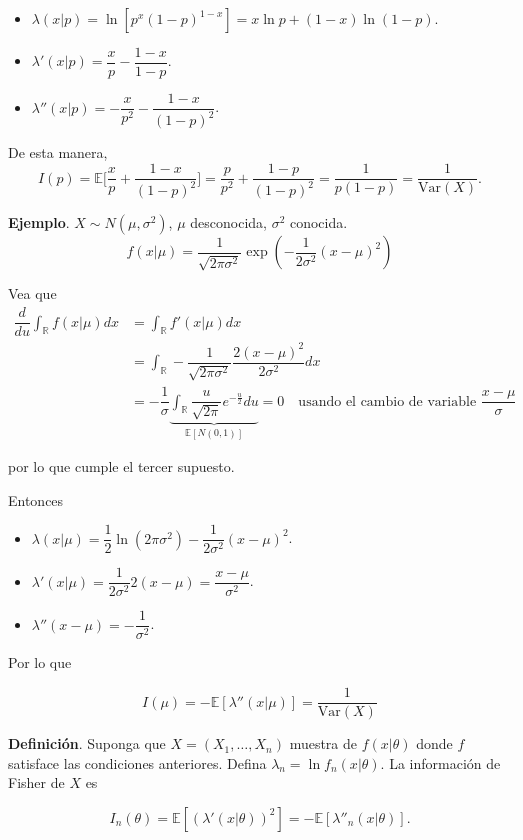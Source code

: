 \documentclass[
  12pt,
]{book}
\begin{document}
\begin{itemize}
\item
  \(\lambda(x|p) = \ln[p^x(1-p)^{1-x}] = x\ln p + (1-x)\ln(1-p)\).
\item
  \(\lambda'(x|p) = \dfrac xp-\dfrac{1-x}{1-p}\).
\item
  \(\lambda''(x|p) = -\dfrac x{p^2}-\dfrac{1-x}{(1-p)^2}\).
\end{itemize}

De esta manera,
\[I(p) = \mathbb E\bigg[\dfrac xp + \dfrac{1-x}{(1-p)^2}\bigg] = \dfrac p{p^2}+\dfrac{1-p}{(1-p)^2} = \dfrac 1{p(1-p)} = \dfrac 1{\text{Var}(X)}.\]

\textbf{Ejemplo}. \(X\sim N(\mu,\sigma^2)\), \(\mu\) desconocida, \(\sigma^2\) conocida.
\[f(x|\mu) = \dfrac{1}{\sqrt{2\pi\sigma^2}}\exp\left(-\dfrac 1{2\sigma^2}(x-\mu)^2\right)\]

Vea que
\begin{align*}
\dfrac d{du}\int_{\mathbb R} f(x|\mu)dx & = \int_{\mathbb R}f'(x|\mu)dx\\
& = \int_{\mathbb R} -\dfrac 1{\sqrt{2\pi\sigma^2}}\dfrac {2(x-\mu)^2}{2\sigma^2} dx\\
& = -\dfrac 1\sigma \underbrace{\int_{\mathbb R}\dfrac{u}{\sqrt{2\pi}}e^{-\frac{u}2}du}_{\mathbb E[N(0,1)]} = 0 \quad \text{usando el cambio de variable } \dfrac{x-\mu}\sigma
\end{align*}

por lo que cumple el tercer supuesto.

Entonces

\begin{itemize}
\item
  \(\lambda(x|\mu) = \dfrac 12 \ln (2\pi\sigma^2)-\dfrac 1{2\sigma^2}(x-\mu)^2\).
\item
  \(\lambda'(x|\mu) = \dfrac 1{2\sigma^2}2(x-\mu) = \dfrac{x-\mu}{\sigma^2}\).
\item
  \(\lambda''(x-\mu) = -\dfrac 1{\sigma^2}\).
\end{itemize}

Por lo que

\[I(\mu) = -\mathbb E[\lambda''(x|\mu)] = \dfrac{1}{\text{Var}(X)}\]

\textbf{Definición}. Suponga que \(X = (X_1,\dots,X_n)\) muestra de \(f(x|\theta)\) donde \(f\) satisface las condiciones anteriores. Defina \(\lambda_n = \ln f_n(x|\theta)\). La información de Fisher de \(X\) es

\[I_n(\theta) = \mathbb E[(\lambda'(x|\theta))^2] = - \mathbb E[\lambda''_n(x|\theta)].\]
\end{document}
